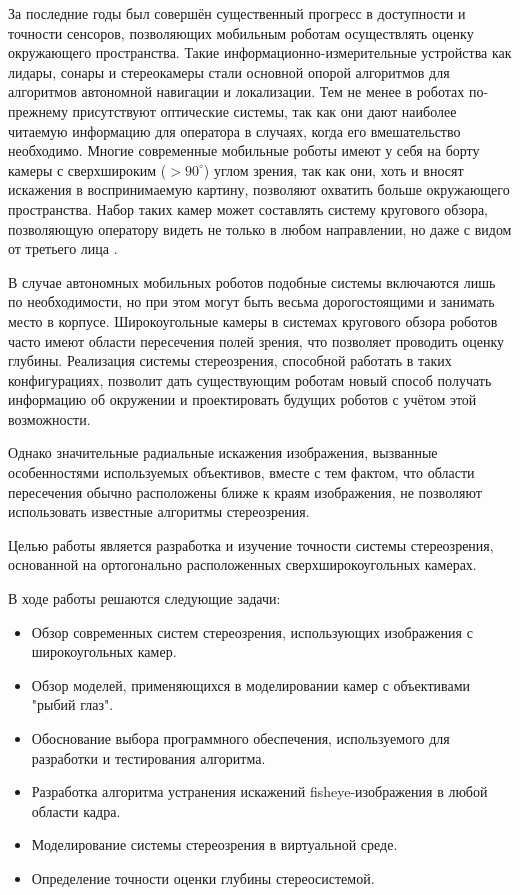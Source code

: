 За последние годы был совершён существенный прогресс в доступности и точности сенсоров, позволяющих мобильным роботам 
осуществлять оценку окружающего пространства. Такие информационно-измерительные устройства как лидары, сонары и стереокамеры
 стали основной опорой алгоритмов для алгоритмов автономной навигации и локализации. Тем не менее в роботах по-прежнему 
присутствуют оптические системы, так как они дают наиболее читаемую информацию для оператора в случаях, когда его вмешательство 
необходимо. Многие современные мобильные роботы имеют у себя на борту камеры с сверхшироким ($ > 90^\circ $)                      
углом зрения, так как они, хоть и вносят искажения в воспринимаемую картину, позволяют охватить больше окружающего пространства.               %
Набор таких камер может составлять систему кругового обзора, позволяющую оператору видеть не только в любом направлении,                %
но даже с видом от третьего лица \cite{birdeye}. 
    
В случае автономных мобильных роботов подобные системы включаются лишь по необходимости, но при этом могут быть весьма 
дорогостоящими и занимать место в корпусе. Широкоугольные камеры в системах кругового обзора роботов часто имеют области                     %
пересечения полей зрения, что позволяет проводить оценку глубины. Реализация системы стереозрения, способной работать в таких
конфигурациях, позволит дать существующим роботам новый способ получать информацию об окружении и проектировать будущих роботов 
с учётом этой возможности. 

Однако значительные радиальные искажения изображения, вызванные особенностями используемых объективов, вместе с тем фактом, что 
области пересечения обычно расположены ближе к краям изображения, не позволяют использовать известные алгоритмы стереозрения.                                       %

Целью работы является разработка и изучение точности системы стереозрения, основанной на ортогонально расположенных сверхширокоугольных камерах.

В ходе работы решаются следующие задачи:
\begin{itemize}     %
    \item Обзор современных систем стереозрения, использующих изображения с широкоугольных камер.
    \item Обзор моделей, применяющихся в моделировании камер с объективами "рыбий глаз".
    \item Обоснование выбора программного обеспечения, используемого для разработки и тестирования алгоритма. 
    \item Разработка алгоритма устранения искажений fisheye-изображения в любой области кадра. %
    \item Моделирование системы  стереозрения в виртуальной среде.                                    
    \item Определение точности оценки глубины стереосистемой.  
\end{itemize}


\clearpage